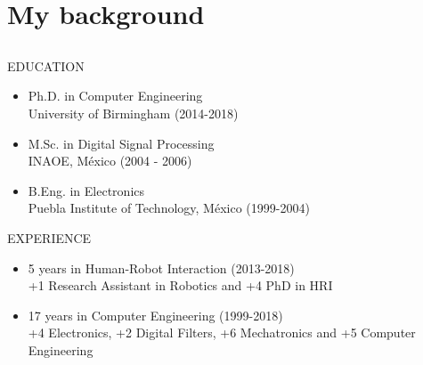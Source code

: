 \section{My background}

\small 

\subsection{}
{
\begin{frame}{}


EDUCATION
\begin{itemize}	
	\item Ph.D. in Computer Engineering \\
	University of Birmingham (2014-2018)
	\item M.Sc. in Digital Signal Processing \\
	INAOE, M\'exico (2004 - 2006)
	\item B.Eng. in Electronics \\
	Puebla Institute of Technology, M\'exico (1999-2004)
\end{itemize}

EXPERIENCE 

\begin{itemize}
	\item 5 years in Human-Robot Interaction (2013-2018) \\
		+1 Research Assistant in Robotics and +4 PhD in HRI
	\item 17 years in Computer Engineering (1999-2018) \\
		+4 Electronics, +2 Digital Filters, +6 Mechatronics and +5 Computer Engineering
		
\end{itemize}


\end{frame}
}



\subsection{}
{
\begin{frame}{}


    \begin{figure}
   \end{figure}



\end{frame}
}



